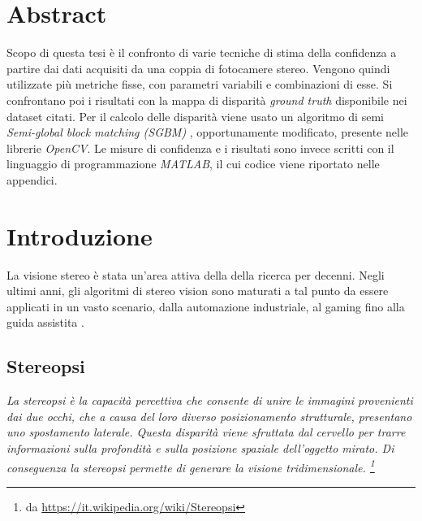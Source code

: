 \documentclass[12pt]{report}
\newcommand{\nullpage}{\newpage\null\thispagestyle{empty}}  %
\begin{document}
	\chapter*{Abstract}
	\label{sec:Abstract}
	\pagestyle{fancy}
	
	Scopo di questa tesi è il confronto di varie tecniche di stima della confidenza a partire dai dati acquisiti da una coppia di fotocamere stereo. Vengono quindi utilizzate più metriche fisse, con parametri variabili e combinazioni di esse. Si confrontano poi i risultati con la mappa di disparità \textit{ground truth} disponibile nei dataset citati. Per il calcolo delle disparità viene usato un algoritmo di semi \textit{Semi-global block matching (SGBM)} , opportunamente modificato, presente nelle librerie \textit{OpenCV}. Le misure di confidenza e i risultati sono invece scritti con il linguaggio di programmazione \textit{MATLAB}, il cui codice viene riportato nelle appendici.
	

	\nullpage						%
	\tableofcontents				%
	\nullpage						%

	\renewcommand{\thepage}{\arabic{page}} %
	\setcounter{page}{1}                   %


	\chapter{Introduzione}
	\label{sec:introduzione}
	\pagestyle{fancy}
	
		La visione stereo è stata un'area attiva della della ricerca per decenni. Negli ultimi anni, gli algoritmi di stereo vision sono maturati a tal punto da essere applicati in un vasto scenario, dalla automazione industriale, al gaming fino alla guida assistita \cite{mercedes}.
	
		\section{Stereopsi}
		\label{sec:Stereopsi}
			\textit{
			La stereopsi è la capacità percettiva che consente di unire le immagini provenienti dai due occhi, che a causa del loro diverso posizionamento strutturale, presentano uno spostamento laterale. Questa disparità viene sfruttata dal cervello per trarre informazioni sulla profondità e sulla posizione spaziale dell'oggetto mirato. Di conseguenza la stereopsi permette di generare la visione tridimensionale. \footnote{da \url{https://it.wikipedia.org/wiki/Stereopsi}} \newline}
			
\end{document}
